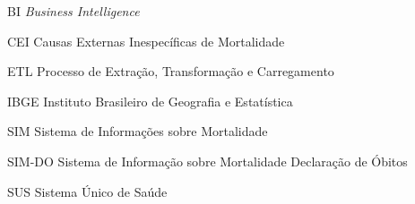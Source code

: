 \begin{siglas}
    
    \item[BI] \textit{Business Intelligence}
    \item[CEI] Causas Externas Inespecíficas de Mortalidade
    \item[ETL] Processo de Extração, Transformação e Carregamento
    \item[IBGE] Instituto Brasileiro de Geografia e Estatística
    \item[SIM] Sistema de Informações sobre Mortalidade
    \item[SIM-DO] Sistema de Informação sobre Mortalidade Declaração de Óbitos
    \item[SUS] Sistema Único de Saúde
    
\end{siglas}
